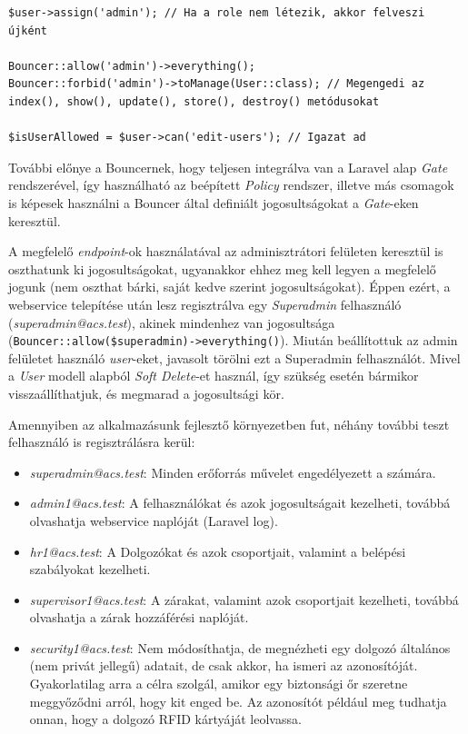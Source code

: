 \documentclass[a4paper,12pt]{thesis-ekf}
\theoremstyle{definition}
\begin{document}
			\begin{lstlisting}[caption={Bouncer haszn\'alata},captionpos=b]
$user->assign('admin'); // Ha a role nem létezik, akkor felveszi újként
			
Bouncer::allow('admin')->everything();
Bouncer::forbid('admin')->toManage(User::class); // Megengedi az index(), show(), update(), store(), destroy() metódusokat 

$isUserAllowed = $user->can('edit-users'); // Igazat ad
			\end{lstlisting}
			
			További előnye a Bouncernek, hogy teljesen integrálva van a Laravel alap \emph{Gate} rendszerével, így használható az beépített \emph{Policy} rendszer, illetve más csomagok is képesek használni a Bouncer által definiált jogosultságokat a \emph{Gate}-eken keresztül.\cite{bouncer-gate}
			
			A megfelelő \emph{endpoint}-ok használatával az adminisztrátori felületen keresztül is oszthatunk ki jogosultságokat, ugyanakkor ehhez meg kell legyen a megfelelő jogunk (nem oszthat bárki, saját kedve szerint jogosultságokat). Éppen ezért, a webservice telepítése után lesz regisztrálva egy \emph{Superadmin} felhasználó (\emph{superadmin@acs.test}), akinek mindenhez van jogosultsága (\texttt{Bouncer::allow(\$superadmin)->everything()}). Miután beállítottuk az admin felületet használó \emph{user}-eket, javasolt törölni ezt a Superadmin felhasználót. Mivel a \emph{User} modell alapból \emph{Soft Delete}-et használ, így szükség esetén bármikor visszaállíthatjuk, és megmarad a jogosultsági kör.
			
			Amennyiben az alkalmazásunk fejlesztő környezetben fut, néhány további teszt felhasználó is regisztrálásra kerül:
			\begin{itemize}
				\item \emph{superadmin@acs.test}: Minden erőforrás művelet engedélyezett a számára.
				\item \emph{admin1@acs.test}: A felhasználókat és azok jogosultságait kezelheti, továbbá olvashatja webservice naplóját (Laravel log).
				\item \emph{hr1@acs.test}: A Dolgozókat és azok csoportjait, valamint a belépési szabályokat kezelheti.
				\item \emph{supervisor1@acs.test}: A zárakat, valamint azok csoportjait kezelheti, továbbá olvashatja a zárak hozzáférési naplóját.
				\item \emph{security1@acs.test}: Nem módosíthatja, de megnézheti egy dolgozó általános (nem privát jellegű) adatait, de csak akkor, ha ismeri az azonosítóját. \\
				Gyakorlatilag arra a célra szolgál, amikor egy biztonsági őr szeretne meggyőződni arról, hogy kit enged be. Az azonosítót például meg tudhatja onnan, hogy a dolgozó RFID kártyáját leolvassa.
			\end{itemize}
		
\end{document}
